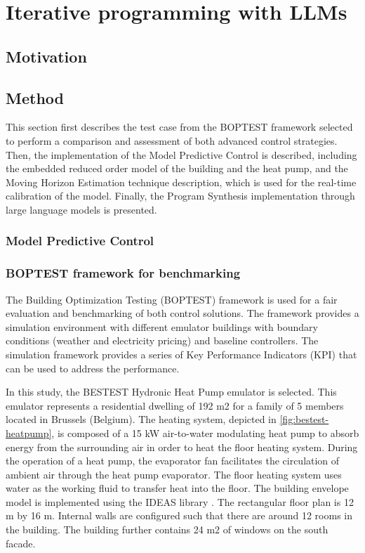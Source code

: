 \chapter{Iterative programming with LLMs}
\label{ch:boptest}

\section{Motivation}

\todo{}

\newpage
\section{Method}
This section first describes the test case from the BOPTEST framework selected to perform a comparison and assessment of both advanced control strategies. Then, the implementation of the Model Predictive Control is described, including the embedded reduced order model of the building and the heat pump, and the Moving Horizon Estimation technique description, which is used for the real-time calibration of the model. Finally, the Program Synthesis implementation through large language models is presented.

\subsection{Model Predictive Control}


\newpage
\subsection{BOPTEST framework for benchmarking}
\label{sec:BOPTEST}
The Building Optimization Testing (BOPTEST) framework \cite{Blum2021} is used for a fair evaluation and benchmarking of both control solutions. The framework provides a simulation environment with different emulator buildings with boundary conditions (weather and electricity pricing) and baseline controllers. The simulation framework provides a series of Key Performance Indicators (KPI) that can be used to address the performance.

In this study, the BESTEST Hydronic Heat Pump emulator is selected. This emulator represents a residential dwelling of 192 m2 for a family of 5 members located in Brussels (Belgium).  The heating system, depicted in \ref{fig:bestest-heatpump}, is composed of a 15 kW air-to-water modulating heat pump to absorb energy from the surrounding air in order to heat the floor heating system. During the operation of a heat pump, the evaporator fan facilitates the circulation of ambient air through the heat pump evaporator. The floor heating system uses water as the working fluid to transfer heat into the floor. The building envelope model is implemented using the IDEAS library \cite{Jorissen2018}. The rectangular floor plan is 12 m by 16 m. Internal walls are configured such that there are around 12 rooms in the building. The building further contains 24 m2 of windows on the south facade.

